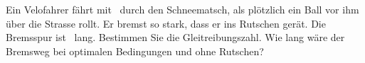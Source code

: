 Ein Velofahrer fährt mit \vVeO\ durch den Schneematsch, als plötzlich ein Ball vor ihm über die Strasse rollt. Er bremst so stark, dass er ins Rutschen gerät. Die Bremsspur ist \sBrO\ lang. Bestimmen Sie die Gleitreibungszahl. Wie lang wäre der Bremsweg bei optimalen Bedingungen und ohne Rutschen?
